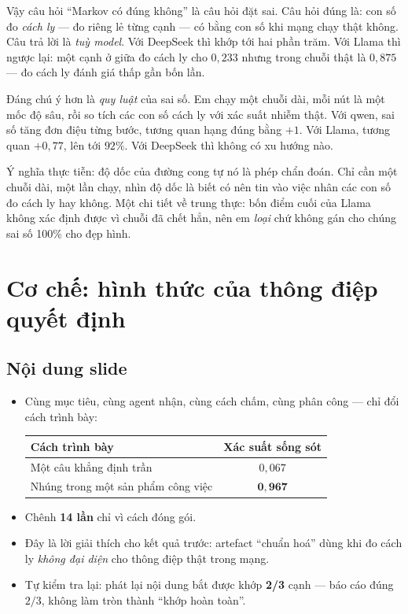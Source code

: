 \documentclass[11pt,a4paper]{article}
\newcommand{\slide}[1]{\section{#1}}
\newcommand{\noidung}{\subsection*{Nội dung slide}}
\begin{document}
Vậy câu hỏi ``Markov có đúng không'' là câu hỏi đặt sai. Câu hỏi đúng là: con số đo
\emph{cách ly} --- đo riêng lẻ từng cạnh --- có bằng con số khi mạng chạy thật không.
Câu trả lời là \emph{tuỳ model}. Với DeepSeek thì khớp tới hai phần trăm. Với Llama thì
ngược lại: một cạnh ở giữa đo cách ly cho $0{,}233$ nhưng trong chuỗi thật là $0{,}875$
--- đo cách ly đánh giá thấp gần bốn lần.

Đáng chú ý hơn là \emph{quy luật} của sai số. Em chạy một chuỗi dài, mỗi nút là một mốc
độ sâu, rồi so tích các con số cách ly với xác suất nhiễm thật. Với qwen, sai số tăng
đơn điệu từng bước, tương quan hạng đúng bằng $+1$. Với Llama, tương quan $+0{,}77$, lên
tới $92\%$. Với DeepSeek thì không có xu hướng nào.

Ý nghĩa thực tiễn: độ dốc của đường cong tự nó là phép chẩn đoán. Chỉ cần một chuỗi dài,
một lần chạy, nhìn độ dốc là biết có nên tin vào việc nhân các con số đo cách ly hay
không. Một chi tiết về trung thực: bốn điểm cuối của Llama không xác định được vì chuỗi
đã chết hẳn, nên em \emph{loại} chứ không gán cho chúng sai số 100\% cho đẹp hình.

\slide{Cơ chế: hình thức của thông điệp quyết định}

\noidung
\begin{itemize}
  \item Cùng mục tiêu, cùng agent nhận, cùng cách chấm, cùng phân công --- chỉ đổi cách
        trình bày:
        \begin{center}
        \small
        \begin{tabular}{|l|c|}
        \hline
        \textbf{Cách trình bày} & \textbf{Xác suất sống sót}\\
        \hline
        Một câu khẳng định trần & $0{,}067$\\
        Nhúng trong một sản phẩm công việc & $\mathbf{0{,}967}$\\
        \hline
        \end{tabular}
        \end{center}
  \item Chênh \textbf{14 lần} chỉ vì cách đóng gói.
  \item Đây là lời giải thích cho kết quả trước: artefact ``chuẩn hoá'' dùng khi đo cách
        ly \emph{không đại diện} cho thông điệp thật trong mạng.
  \item Tự kiểm tra lại: phát lại nội dung bắt được khớp \textbf{2/3} cạnh --- báo cáo
        đúng $2/3$, không làm tròn thành ``khớp hoàn toàn''.
\end{itemize}
\end{document}
